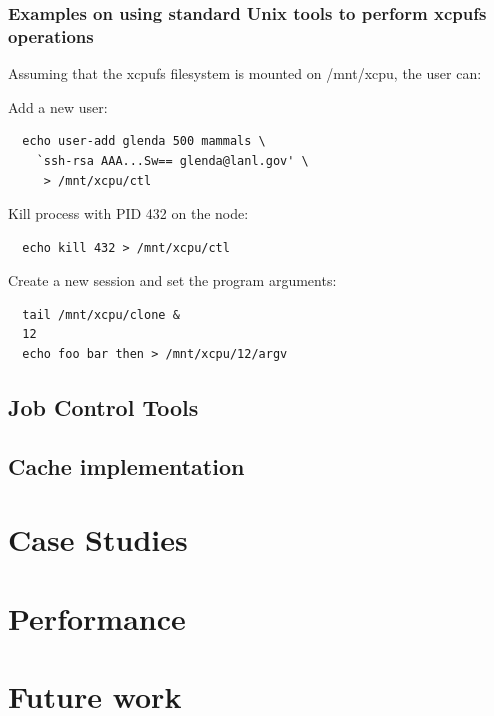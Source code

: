 \documentclass[10pt,conference,letterpaper]{IEEEtran}
\begin{document}
\subsubsection{Examples on using standard Unix tools to perform xcpufs
operations}

Assuming that the xcpufs filesystem is mounted on /mnt/xcpu, the user can:

Add a new user:

\begin{verbatim}
  echo user-add glenda 500 mammals \
    `ssh-rsa AAA...Sw== glenda@lanl.gov' \
     > /mnt/xcpu/ctl
\end{verbatim}

Kill process with PID 432 on the node:

\begin{verbatim}
  echo kill 432 > /mnt/xcpu/ctl
\end{verbatim}

Create a new session and set the program arguments:

\begin{verbatim}
  tail /mnt/xcpu/clone &
  12
  echo foo bar then > /mnt/xcpu/12/argv
\end{verbatim}

\subsection{Job Control Tools}

\subsection{Cache implementation}

\section{Case Studies}

\section{Performance}

\section{Future work}




\end{document}
